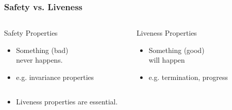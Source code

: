 \begin{frame}
  \titlepage
\end{frame}
\logo{}

\begin{frame}
  \frametitle{Safety vs. Liveness}

  \begin{columns}
    \begin{column}{0.45\textwidth}
      \begin{block}{Safety Properties}
        \begin{itemize}
        \item Something (bad) \\
          \quad \alert{never happens}.
          \medskip
        \item e.g. invariance properties
        \end{itemize}
      \end{block}
    \end{column}
    \begin{column}{0.45\textwidth}
      \begin{block}{Liveness Properties}
        \begin{itemize}
        \item Something (good) \\
          \quad \alert{will happen}
          \medskip
        \item e.g. termination, progress
        \end{itemize}
      \end{block}
    \end{column}
  \end{columns}

  \vspace{2ex}

  \pause
  \begin{itemize}
  \item Liveness properties are \alert{essential}.
    \pause
    
    \smallskip
    \begin{center}
    \end{center}
  \end{itemize}

\end{frame}

